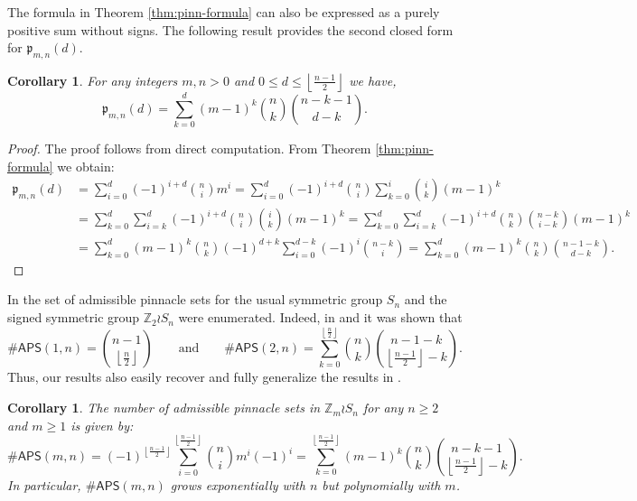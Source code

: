 \documentclass[12pt,reqno]{amsart}
\numberwithin{equation}{section}
\theoremstyle{plain}
\newtheorem{corollary}[theorem]{Corollary}
\theoremstyle{definition}
\theoremstyle{remark}
\newcommand{\Z}{\mathbb{Z}}
\newcommand{\p}{\mathfrak{p}}
\newcommand\APS{\mathsf{APS}}
\newcommand{\floor}[1]{\left\lfloor#1\right\rfloor}
\begin{document}
The formula in Theorem \ref{thm:pinn-formula} can also be expressed as a purely positive sum without signs. The following result provides the second closed form for $\p_{m,n}(d)$.

\begin{corollary}\label{cor:pinformula}
For any integers $m,n>0$ and $0 \leq d \leq \floor{\frac{n-1}{2}}$ we have,
\[
\p_{m,n}(d)= \sum_{k=0}^d(m-1)^k \binom{n}{k}\binom{n-k-1}{d-k}.
    \]
\end{corollary}

\begin{proof}
    The proof follows from direct computation. From Theorem \ref{thm:pinn-formula} we obtain:
\begin{align*}
 \p_{m,n}(d)
&= \sum_{i=0}^{d} (-1)^{i+d} \binom{n}{i}m^i
= \sum_{i=0}^{d} (-1)^{i+d} \binom{n}{i}\sum_{k=0}^i \binom{i}{k}(m-1)^k\\
&= \sum_{k=0}^d \sum_{i=k}^{d} (-1)^{i+d} \binom{n}{i} \binom{i}{k} (m-1)^k
= \sum_{k=0}^d \sum_{i=k}^{d} (-1)^{i+d} \binom{n}{k} \binom{n-k}{i-k}(m-1)^k\\
&= \sum_{k=0}^d  (m-1)^k\binom{n}{k} (-1)^{d+k} \sum_{i=0}^{d-k} (-1)^{i} \binom{n-k}{i}
= \sum_{k=0}^d  (m-1)^k\binom{n}{k}  \binom{n-1-k}{d-k}.
\end{align*}
\end{proof}


In \cite{PinSignedPermutations} the set of admissible pinnacle sets for the usual symmetric group $S_n$ and the signed symmetric group $\Z_2 \wr S_n$ were enumerated. Indeed, in \cite[Proposition 3.11]{PinSignedPermutations} and \cite[Theorem 3.12]{PinSignedPermutations} it was shown that
\[
\#\APS(1,n) = \binom{n-1}{\floor{\frac{n}{2}}}
\qquad \text{and} \qquad
\#\APS(2,n) = \sum_{k=0}^{\floor{\frac{n}{2}}}{\binom{n}{k}\binom{n-1-k}{\floor{\frac{n-1}{2}}-k}}.
\]
 Thus, our results also easily recover and fully generalize the results in \cite{PinSignedPermutations}.


\begin{corollary}\label{cor:APS}
    The number of admissible pinnacle sets in $\Z_m \wr S_n$ for any $n\geq 2$ and $m\geq 1$ is given by:
    \[
\#\APS(m,n)= (-1)^{\floor{\frac{n-1}{2}}}\sum_{i=0}^{\floor{\frac{n-1}{2}}} \binom{n}{i}m^i(-1)^{i}= \sum_{k=0}^{\floor{\frac{n-1}{2}}}(m-1)^k \binom{n}{k}\binom{n-k-1}{\floor{\frac{n-1}{2}}-k}.
    \]
In particular, $\#\APS(m,n)$ grows exponentially with $n$ but polynomially with $m$.
\end{corollary}
\end{document}
